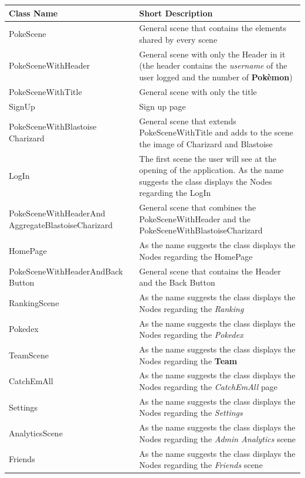 \begin{center}
	\begin{longtable}{| m{14em} | m{19em} |} 
		\hline
		\textbf{Class Name} & \textbf{Short Description} \\ [0.5ex] 
		\hline
		PokeScene & General scene that contains the elements shared by every scene\\ 
		\hline
		PokeSceneWithHeader & General scene with only the Header in it (the header contains the \textit{username} of the user logged and the number of \textbf{Pokèmon})\\ 
		\hline
		PokeSceneWithTitle & General scene with only the title\\ 
		\hline
		SignUp & Sign up page\\ 
		\hline
		PokeSceneWithBlastoise Charizard & General scene that extends PokeSceneWithTitle and adds to the scene the image of Charizard and Blastoise\\ 
		\hline
		LogIn & The first scene the user will see at the opening of the application. As the name suggests the class displays the Nodes regarding the LogIn\\ 
		\hline
		PokeSceneWithHeaderAnd AggregateBlastoiseCharizard & General scene that combines the PokeSceneWithHeader and the PokeSceneWithBlastoiseCharizard\\ 
		\hline
		HomePage & As the name suggests the class displays the Nodes regarding the HomePage\\ 
		\hline
		PokeSceneWithHeaderAndBack Button & General scene that contains the Header and the Back Button\\ 
		\hline
		RankingScene & As the name suggests the class displays the Nodes regarding the \textit{Ranking}\\ 
		\hline
		Pokedex & As the name suggests the class displays the Nodes regarding the \textit{Pokedex}\\ 
		\hline
		TeamScene & As the name suggests the class displays the Nodes regarding the \textbf{Team}\\
		\hline
		CatchEmAll & As the name suggests the class displays the Nodes regarding the \textit{CatchEmAll} page\\
		\hline
		Settings & As the name suggests the class displays the Nodes regarding the \textit{Settings}\\
		\hline
		AnalyticsScene & As the name suggests the class displays the Nodes regarding the \textit{Admin Analytics} scene\\
		\hline
		Friends & As the name suggests the class displays the Nodes regarding the \textit{Friends} scene\\

\end{longtable}
\end{center}
